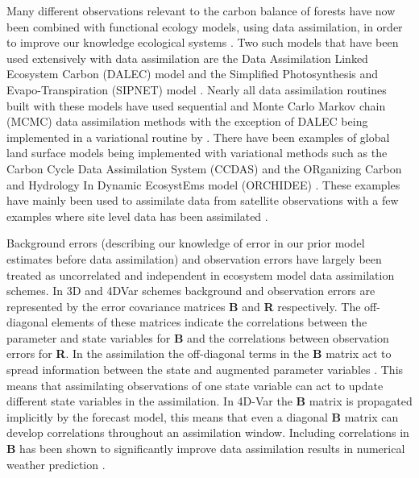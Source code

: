 \documentclass[11pt]{article}
\begin{document}
Many different observations relevant to the carbon balance of forests have now been combined with functional ecology models, using data assimilation, in order to improve our knowledge ecological systems \citep{zobitz2011primer, fox2009reflex, richardson2010estimating, Quaife2008, Zobitz2014, Niu2014}. Two such models that have been used extensively with data assimilation are the Data Assimilation Linked Ecosystem Carbon (DALEC) model \citep{williams2005improved} and the Simplified Photosynthesis and Evapo-Transpiration (SIPNET) model \citep{braswell2005estimating}. Nearly all data assimilation routines built with these models have used sequential and Monte Carlo Markov chain (MCMC) data assimilation methods with the exception of DALEC being implemented in a variational routine by \citet{delahaies2013regularization}. There have been examples of global land surface models being implemented with variational methods such as the Carbon Cycle Data Assimilation System (CCDAS) \citep{Kaminski2013} and the ORganizing Carbon and Hydrology In Dynamic EcosystEms model (ORCHIDEE) \citep{Krinner2005}. These examples have mainly been used to assimilate data from satellite observations with a few examples where site level data has been assimilated \citep{Verbeeck2011, Bacour2015}.

Background errors (describing our knowledge of error in our prior model estimates before data assimilation) and observation errors have largely been treated as uncorrelated and independent in ecosystem model data assimilation schemes. In 3D and 4DVar schemes background and observation errors are represented by the error covariance matrices \textbf{B} and \textbf{R} respectively. The off-diagonal elements of these matrices indicate the correlations between the parameter and state variables for \textbf{B} and the correlations between observation errors for \textbf{R}. In the assimilation the off-diagonal terms in the \textbf{B} matrix act to spread information between the state and augmented parameter variables \citep{kalnay2003atmospheric}. This means that assimilating observations of one state variable can act to update different state variables in the assimilation. In 4D-Var the \textbf{B} matrix is propagated implicitly by the forecast model, this means that even a diagonal \textbf{B} matrix can develop correlations throughout an assimilation window. Including correlations in \textbf{B} has been shown to significantly improve data assimilation results in numerical weather prediction \citep{bannister2008review}. 
\end{document}
